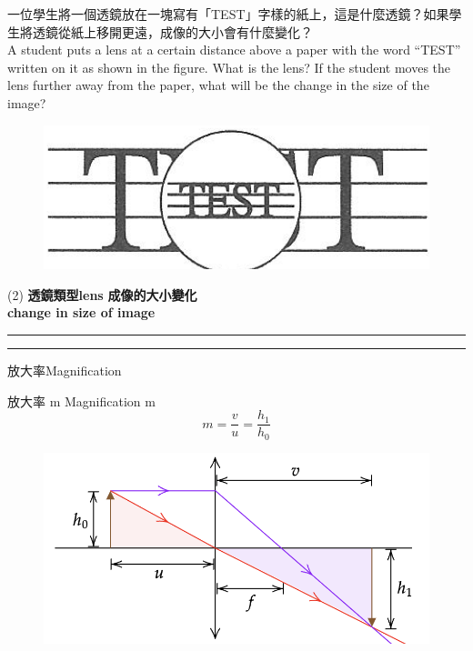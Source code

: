 \documentclass[beamer=true]{standalone}
\begin{document}
\begin{eg}
    一位學生將一個透鏡放在一塊寫有「TEST」字樣的紙上，這是什麼透鏡？如果學生將透鏡從紙上移開更遠，成像的大小會有什麼變化？\\A student puts a lens at a certain distance above a paper with the word ``TEST'' written on it as shown in the figure. What is the lens? If the student moves the lens further away from the paper, what will be the change in the size of the image?
    \begin{figure}
        \centering
        \includegraphics[width=0.5\linewidth]{assets/98n9du892nd923.png}
    \end{figure}
    \begin{tasks}[item-indent=2em,label-offset=0em,before-skip=0em,after-item-skip=.8em](2)
        \task [] \textbf{透鏡類型lens}
        \task [] \textbf{成像的大小變化\\change in size of image}
        \task [] \rule{1.5in}{.5pt}
        \task [] \rule{1.5in}{.5pt}
    \end{tasks}
\end{eg}

\begin{frame}{放大率Magnification}
    \begin{alertblock}
        {放大率 m Magnification m}
        \begin{equation}
            m=\frac{v}{u}=\frac{h_1}{h_0}
        \end{equation}

    \end{alertblock}
    \bigskip
    \begin{figure}
        \centering
        \includegraphics[width=0.7\linewidth]{assets/nxcu3489f43.png}
    \end{figure}
\end{frame}
\end{document}
